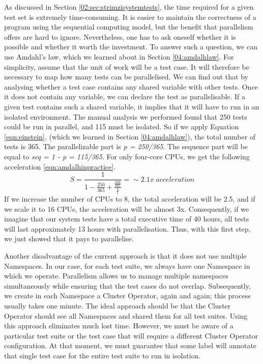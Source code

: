 As discussed in Section \ref{02:sec:strimzisystemtests}, the time required for a given test set is extremely time-consuming.
It is easier to maintain the correctness of a program using the sequential computing model, but the benefit that parallelism offers are hard to ignore.
Nevertheless, one has to ask oneself whether it is possible and whether it worth the investment.
To answer such a question, we can use Amdahl's law, which we learned about in Section \ref{04:amdalhlaw}.
For simplicity, assume that the unit of work will be a test case.
It will therefore be necessary to map how many tests can be parallelised.
We can find out that by analysing whether a test case contains any shared variable with other tests.
Once it does not contain any variable, we can declare the test as parallelisable.
If a given test contains such a shared variable, it implies that it will have to run in an isolated environment.
The manual analysis we performed found that 250 tests could be run in parallel, and 115 must be isolated. So if we apply Equation \eqref{eqn:einstein}, (which we learned in Section \ref{04:amdalhlaw}), the total number of tests is 365. The parallelizable part is \emph{p = 250/365}.
The sequence part will be equal to \emph{seq = 1 - p = 115/365}.
For only four-core CPUs, we get the following acceleration \eqref{eqn:amdalhinpractice}.
\begin{equation}
    \label{eqn:amdalhinpractice}
    S = \frac{1}{1 - \frac{250}{365} + \frac{\frac{250}{365}}{\frac{4}{1}}} =\sim 2.1x \; acceleration
    \tag{3}
\end{equation}
If we increase the number of CPUs to 8, the total acceleration will be 2.5, and if we scale it to 16 CPUs, the acceleration will be almost 3x.
Consequently, if we imagine that our system tests have a total executive time of 40 hours, all tests will last approximately 13 hours with parallelisation.
Thus, with this first step, we just showed that it pays to parallelise.

Another disadvantage of the current approach is that it does not use multiple Namespaces.
In our case, for each test suite, we always have one Namespace in which we operate.
Parallelism allows us to manage multiple namespaces simultaneously while ensuring that the test cases do not overlap.
Subsequently, we create in each Namespace a Cluster Operator, again and again;
this process usually takes one minute.
The ideal approach should be that the Cluster Operator should see all Namespaces and shared them for all test suites.
Using this approach eliminates much lost time.
However, we must be aware of a particular test suite or the test case that will require a different Cluster Operator configuration.
At that moment, we must guarantee that some label will annotate that single test case for the entire test suite to run in isolation.

